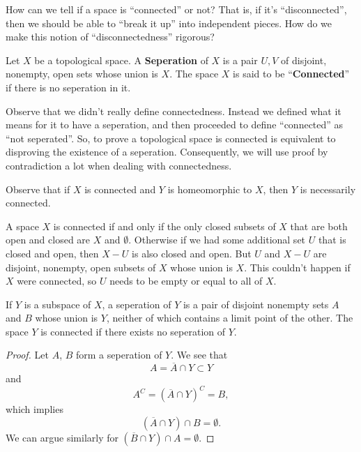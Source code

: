 \begin{prob}
How can we tell if a space is ``connected'' or not? That is, if
it's ``disconnected'', then we should be able to ``break it up''
into independent pieces. How do we make this notion of
``disconnectedness'' rigorous?
\end{prob}
\begin{defn}\label{defn:seperation}
Let $X$ be a topological space. A \textbf{Seperation} of $X$ is a
pair $U,V$ of disjoint, nonempty, open sets whose union is
$X$. The space $X$ is said to be ``\textbf{Connected}'' if there
is no seperation in it.
\end{defn}
\begin{rmk}
Observe that we didn't really define connectedness. Instead we
defined what it means for it to have a seperation, and then
proceeded to define ``connected'' as ``not seperated''. So, to
prove a topological space is connected is equivalent to
disproving the existence of a seperation. Consequently, we will
use proof by contradiction a lot when dealing with connectedness.
\end{rmk}
\begin{rmk}
Observe that if $X$ is connected and $Y$ is homeomorphic to $X$,
then $Y$ is necessarily connected.
\end{rmk}
\begin{rmk}
A space $X$ is connected if and only if the only closed subsets
of $X$ that are both open and closed are $X$ and
$\emptyset$. Otherwise if we had some additional set $U$ that is
closed and open, then $X-U$ is also closed and open. But $U$ and
$X-U$ are disjoint, nonempty, open subsets of $X$ whose union is
$X$. This couldn't happen if $X$ were connected, so $U$ needs to
be empty or equal to all of $X$.
\end{rmk}
\begin{lem}\label{lemma:subspaceConnectedness}
If $Y$ is a subspace of $X$, a seperation of $Y$ is a pair of
disjoint nonempty sets $A$ and $B$ whose union is $Y$, neither of
which contains a limit point of the other. The space $Y$ is
connected if there exists no seperation of $Y$.
\end{lem}
\begin{proof}
Let $A$, $B$ form a seperation of $Y$. We see that
\begin{equation}%
A=\overline{A}\cap Y\subset Y
\end{equation}
and
\begin{equation}%
A^{C}=(\overline{A}\cap Y)^{C}=B,
\end{equation}
which implies
\begin{equation}%
(\overline{A}\cap Y)\cap B=\emptyset.
\end{equation}
We can argue similarly for $(\overline{B}\cap Y)\cap A=\emptyset$.
\end{proof}
